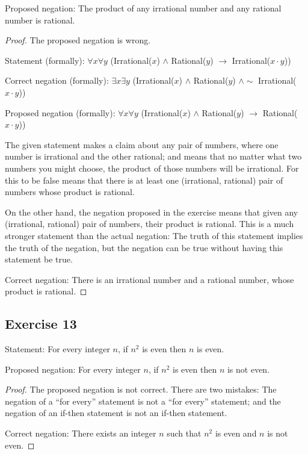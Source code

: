 \documentclass[14pt]{extarticle}
\newcommand{\fa}{\forall}
\newcommand{\te}{\exists}
\begin{document}
Proposed negation: The product of any irrational number and any rational number is rational.

\begin{proof}
    The proposed negation is wrong.

    Statement (formally): $\fa x \fa y$ (Irrational($x$) $\wedge$ Rational($y$) $\to$ Irrational($x \cdot y$))

    Correct negation (formally): $\te x \te y$ (Irrational($x$) $\wedge$ Rational($y$) $\wedge\sim$ Irrational($x \cdot y$))

    Proposed negation (formally): $\fa x \fa y$ (Irrational($x$) $\wedge$ Rational($y$) $\to$ Rational($x \cdot y$))

    The given statement makes a claim about any pair of numbers, where one number is irrational and the other rational; and means that no matter what two numbers you might choose, the product of those numbers will be irrational. For this to be false means that there is at least one (irrational, rational) pair of numbers whose product is rational.

    On the other hand, the negation proposed in the exercise means that given any (irrational, rational) pair of numbers, their product is rational. This is a much stronger statement than the actual negation: The truth of this statement implies the truth of the negation, but the negation can be true without having this statement be true.

    Correct negation: There is an irrational number and a rational number, whose product is rational.
\end{proof}

\subsection{Exercise 13}
Statement: For every integer $n$, if $n^2$ is even then $n$ is even.

Proposed negation: For every integer $n$, if $n^2$ is even then $n$ is not even.

\begin{proof}
    The proposed negation is not correct. There are two mistakes: The negation of a “for every” statement is not a “for every” statement; and the negation of an if-then statement is not an if-then statement.

    Correct negation: There exists an integer $n$ such that $n^2$ is even and $n$ is not even.
\end{proof}
\end{document}
